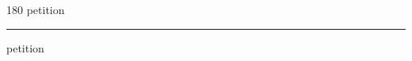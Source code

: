 
\begin{frame}
\begin{center}
\begin{turn}{180}
{\fontsize{2.5cm}{1em}\selectfont petition}
\end{turn}
\vspace{1em}\par  
\hrule
\vspace{1em}\par  
{\fontsize{2.5cm}{1em}\selectfont petition}
\end{center}
\end{frame}
